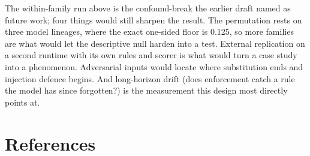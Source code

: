 \documentclass{article}
\begin{document}
 The within-family run above is the confound-break the earlier draft named as future work; four things would still sharpen the result. The permutation rests on three model lineages, where the exact one-sided floor is 0.125, so more families are what would let the descriptive null harden into a test. External replication on a second runtime with its own rules and scorer is what would turn a case study into a phenomenon. Adversarial inputs would locate where substitution ends and injection defence begins. And long-horizon drift (does enforcement catch a rule the model has since forgotten?) is the measurement this design most directly points at.

\section*{References}\label{references}
\end{document}
